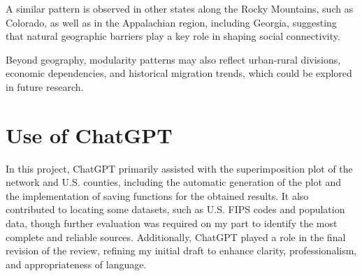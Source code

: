 A similar pattern is observed in other states along the Rocky Mountains, such as Colorado, as well as in the Appalachian region, including Georgia, suggesting that natural geographic barriers play a key role in shaping social connectivity.

Beyond geography, modularity patterns may also reflect urban-rural divisions, economic dependencies, and historical migration trends, which could be explored in future research.

\section{Use of ChatGPT}

In this project, ChatGPT \cite{OpenAI2025} primarily assisted with the superimposition plot of the network and U.S. counties, including the automatic generation of the plot and the implementation of saving functions for the obtained results. It also contributed to locating some datasets, such as U.S. FIPS codes and population data, though further evaluation was required on my part to identify the most complete and reliable sources. Additionally, ChatGPT played a role in the final revision of the review, refining my initial draft to enhance clarity, professionalism, and appropriateness of language.


\newpage